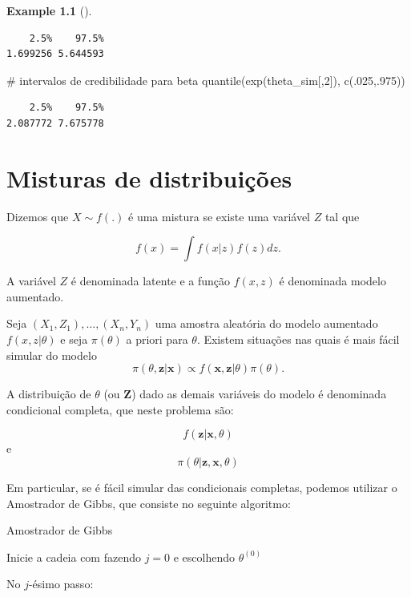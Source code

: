 \documentclass[
  letterpaper,
  DIV=11,
  numbers=noendperiod]{scrreprt}
\newenvironment{Shaded}{\begin{snugshade}}{\end{snugshade}}
\newcommand{\CommentTok}[1]{\textcolor[rgb]{0.37,0.37,0.37}{#1}}
\newcommand{\DecValTok}[1]{\textcolor[rgb]{0.68,0.00,0.00}{#1}}
\newcommand{\FunctionTok}[1]{\textcolor[rgb]{0.28,0.35,0.67}{#1}}
\newcommand{\NormalTok}[1]{\textcolor[rgb]{0.00,0.23,0.31}{#1}}
\theoremstyle{definition}
\theoremstyle{plain}
\theoremstyle{definition}
\newtheorem{example}{Example}[chapter]
\theoremstyle{remark}
\begin{document}
\begin{example}[]
\begin{verbatim}
    2.5%    97.5% 
1.699256 5.644593 
\end{verbatim}

\begin{Shaded}
\begin{Highlighting}[]
\CommentTok{\# intervalos de credibilidade para beta}
\FunctionTok{quantile}\NormalTok{(}\FunctionTok{exp}\NormalTok{(theta\_sim[,}\DecValTok{2}\NormalTok{]), }\FunctionTok{c}\NormalTok{(.}\DecValTok{025}\NormalTok{,.}\DecValTok{975}\NormalTok{))}
\end{Highlighting}
\end{Shaded}

\begin{verbatim}
    2.5%    97.5% 
2.087772 7.675778 
\end{verbatim}


\chapter{Misturas de
distribuições}\label{misturas-de-distribuiuxe7uxf5es}

Dizemos que \(X\sim f(.)\) é uma mistura se existe uma variável \(Z\)
tal que

\[f(x)=\int f(x|z)f(z)dz.\]

A variável \(Z\) é denominada latente e a função \(f(x,z)\) é denominada
modelo aumentado.

Seja \((X_1,Z_1),\ldots,(X_n,Y_n)\) uma amostra aleatória do modelo
aumentado \(f(x,z|\theta)\) e seja \(\pi(\theta)\) a priori para
\(\theta\). Existem situações nas quais é mais fácil simular do modelo
\[\pi(\theta,\boldsymbol{z}|\boldsymbol{x})\varpropto f(\boldsymbol{x},\boldsymbol{z}|\theta)\pi(\theta).\]

A distribuição de \(\theta\) (ou \(\boldsymbol{Z}\)) dado as demais
variáveis do modelo é denominada condicional completa, que neste
problema são:

\[f(\boldsymbol{z}|\boldsymbol{x},\theta)\] e
\[\pi(\theta|\boldsymbol{z},\boldsymbol{x},\theta)\]

Em particular, se é fácil simular das condicionais completas, podemos
utilizar o Amostrador de Gibbs, que consiste no seguinte algoritmo:

Amostrador de Gibbs

Inicie a cadeia com fazendo \(j=0\) e escolhendo \(\theta^{(0)}\)

No \(j\)-ésimo passo:


\end{example}
\end{document}

